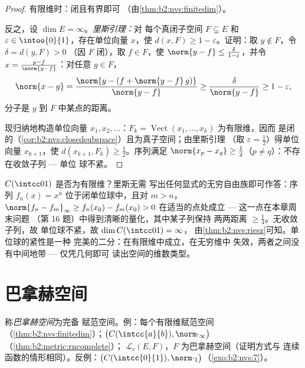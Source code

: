 \begin{proof}
有限维时：闭且有界即可
（由\cref{thm:b2:nvs:finitedim}）。

反之，设 $\dim E = \infty$。\emph{里斯引理：}对
每个真闭子空间 $F \subsetneq E$ 和 $\varepsilon \in
\intoo{0}{1}$，存在单位向量 $x$，使 $d(x, F) \geq 1 -
\varepsilon$。证明：取 $y \notin F$，令 $\delta = d(y, F) > 0$
（因 $F$ 闭），取 $f \in F$，使 $\norm{y - f} \leq
\frac{\delta}{1 - \varepsilon}$，并令 $x = \frac{y - f}{\norm{y -
f}}$：对任意 $g \in F$，
\[
\norm{x - g} = \frac{\norm{y - (f + \norm{y-f}\,g)}}{\norm{y - f}}
\geq \frac{\delta}{\norm{y-f}} \geq 1 - \varepsilon ,
\]
分子是 $y$ 到 $F$ 中某点的距离。

现归纳地构造单位向量 $x_1, x_2, \dots$：$F_k =
\operatorname{Vect}(x_1, \dots, x_k)$ 为有限维，因而
是闭的（\cref{cor:b2:nvs:closedsubspace}）且为真子空间；由里斯引理
（取 $\varepsilon = \frac12$）得单位向量 $x_{k+1}$，使 $d(x_{k+1},
F_k) \geq \frac12$。序列满足 $\norm{x_p - x_q} \geq
\frac12$（$p \neq q$）：不存在收敛子列 --- 单位
球不紧。
\end{proof}

\begin{example}[里斯作为维数探测器]\label{ex:b2:nvs:rieszdetector}
$C(\intcc01)$ 是否为有限维？里斯无需
写出任何显式的无穷自由族即可作答：序列
$f_n(x) = x^n$ 位于闭单位球中，且对
$m > n$，$\norm{f_n - f_m}_\infty \geq f_n(x_0) - f_m(x_0) > 0$
在适当的点处成立 --- 这一点在本章周末问题
（第 16 题）中得到清晰的量化，其中某子列保持
两两距离 $\geq \frac14$。无收敛子列，故
单位球不紧，故 $\dim C(\intcc01) = \infty$，
由\cref{thm:b2:nvs:riesz}可知。单位球的紧性是一种
完美的二分：在有限维中成立，在无穷维中
失效，两者之间没有中间地带 --- 仅凭几何即可
读出空间的维数类型。
\end{example}

\section{巴拿赫空间}

\begin{definition}\label{def:b2:nvs:banach}
称\emph{巴拿赫空间}为完备
赋范空间。例：每个有限维赋范空间
（\cref{thm:b2:nvs:finitedim}）；$\bigl(C(\intcc{a}{b}),
\norm\cdot_\infty\bigr)$（\cref{thm:b2:metric:rncomplete}）；
$\mathcal{L}_c(E, F)$，$F$ 为巴拿赫空间（证明方式与
连续函数的情形相同）。反例：$\bigl(C(\intcc{0}{1}),
\norm\cdot_1\bigr)$（\cref{exo:b2:nvs:7}）。
\end{definition}

